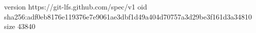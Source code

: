 version https://git-lfs.github.com/spec/v1
oid sha256:adf0eb8176e119376e7e9061ae3dbf1d49a404d70757a3d29be3f161d3a34810
size 43840
